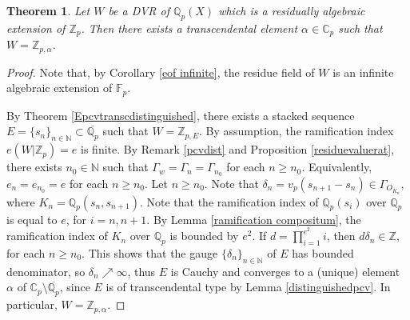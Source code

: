 \documentclass[10pt]{article}
\numberwithin{equation}{section}
\newtheorem{Thm}[equation]{Theorem}
\theoremstyle{definition}\newtheorem{Def}[equation]{Definition}
\theoremstyle{definition}\newtheorem{Ques}[equation]{Question}
\newcommand{\Q}{\mathbb{Q}}
\newcommand{\N}{\mathbb{N}}
\newcommand{\Z}{\mathbb{Z}}
\newcommand{\C}{\mathbb{C}}
\newcommand{\oQp}{\overline{\Q_p}}
\begin{document}
\begin{Thm}\label{DVRoverZp}
Let $W$ be a DVR of $\Q_p(X)$ which is a residually algebraic extension of $\Z_p$. Then there exists a transcendental element $\alpha\in \C_p$ such that $W=\Z_{p,\alpha}$. 
\end{Thm}
\begin{proof}
Note that, by Corollary \ref{eof infinite}, the residue field of $W$ is an infinite algebraic extension of $\mathbb F_p$.

By Theorem \ref{Epcvtranscdistinguished}, there exists a stacked sequence $E=\{s_n\}_{n\in\N}\subset\oQp$ such that $W=\Z_{p,E}$. By assumption, the ramification index $e(W|\Z_p)=e$ is finite. By Remark \ref{pcvdist} and Proposition \ref{residuevaluerat}, there exists $n_0\in\N$ such that $\Gamma_w=\Gamma_{n}=\Gamma_{n_0}$ for each $n\geq n_0$. Equivalently, $e_{n}=e_{n_0}=e$ for each $n\geq n_0$. Let $n\geq n_0$. Note that $\delta_n=v_p(s_{n+1}-s_n)\in \Gamma_{O_{K_n}}$, where $K_n=\Q_p(s_n,s_{n+1})$. Note that the ramification index of $\Q_p(s_i)$ over $\Q_p$ is equal to $e$, for $i=n,n+1$. By Lemma \ref{ramification compositum}, the ramification index of $K_n$ over $\Q_p$ is bounded by $e^2$. If $d=\prod_{i=1}^{e^2} i$, then $d\delta_n\in\Z$, for each $n\geq n_0$. This shows that the gauge $\{\delta_n\}_{n\in\N}$ of $E$ has bounded denominator, so $\delta_n\nearrow\infty$, thus $E$ is Cauchy and converges to a (unique) element $\alpha$ of $\C_p\setminus\oQp$, since $E$ is of transcendental type by Lemma \ref{distinguishedpcv}. In particular, $W=\Z_{p,\alpha}$.
\end{proof}
\end{document}
